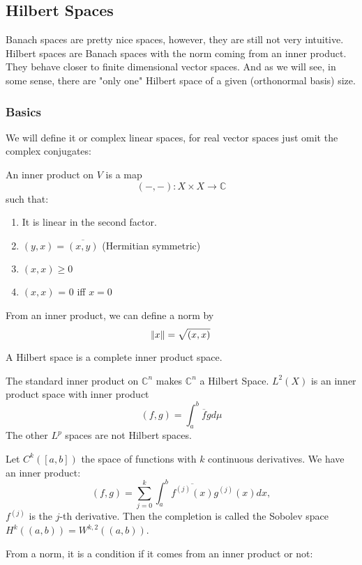 \documentclass[main.tex]{subfiles}
\begin{document}
\subsection{Hilbert Spaces}
Banach spaces are pretty nice spaces, however, they are still not very intuitive. Hilbert spaces are Banach spaces with the norm coming from an inner product. They behave closer to finite dimensional vector spaces. And as we will see, in some sense, there are "only one" Hilbert space of a given (orthonormal basis) size.


\subsubsection{Basics}
We will define it or complex linear spaces, for real vector spaces just omit the complex conjugates:

\begin{definition}
An inner product on $V$ is a map 
$$
(-, -): X \times X \rightarrow \mathbb{C}
$$
such that:
\begin{enumerate}
    \item It is linear in the second factor.
    \item $(y,x) = \overline{(x,y)}$ (Hermitian symmetric)
    \item $(x,x) \geq 0$
    \item $(x,x)$ = 0 iff $x = 0$
\end{enumerate}
\end{definition}

From an inner product, we can define a norm by 
$$
\norm{x} = \sqrt{(x,x)}
$$

\begin{definition}
A Hilbert space is a complete inner product space.
\end{definition}

\begin{example}
The standard inner product on $\mathbb{C}^n$ makes $\mathbb{C}^n$ a Hilbert Space. $L^2(X)$ is an inner product space with inner product
$$
(f,g) = \int_a ^b \overline{f}g d\mu
$$
The other $L^p$ spaces are not Hilbert spaces.

Let $C^k([a,b])$ the space of functions with $k$ continuous derivatives. We have an inner product:
$$
(f,g) = \sum_{j=0} ^k \int_a ^b \overline{f^{(j)}(x)} g^{(j)}(x) dx,
$$
$f^{(j)}$ is the $j$-th derivative. Then the completion is called the Sobolev space $H^k((a,b)) = W^{k,2}((a,b))$.
\end{example}

From a norm, it is a condition if it comes from an inner product or not:
\end{document}
